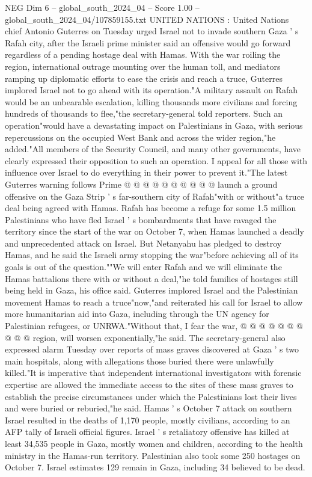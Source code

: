 \begin{textsample}{NEG Dim 6 – global\_south\_2024\_04 – Score 1.00 – global\_south\_2024\_04/107859155.txt}  \label{ex:f6_neg_362}
UNITED NATIONS : United Nations chief Antonio Guterres on Tuesday urged Israel not to invade southern Gaza ' s Rafah city, after the Israeli prime minister said an offensive would go forward regardless of a pending hostage deal with Hamas.
With the war roiling the region, international outrage mounting over the human toll, and mediators ramping up diplomatic efforts to ease the crisis and reach a truce, Guterres implored Israel not to go ahead with its operation."A military assault on Rafah would be an unbearable escalation, killing thousands more civilians and forcing hundreds of thousands to flee,"the secretary-general told reporters.
Such an operation"would have a devastating impact on Palestinians in Gaza, with serious repercussions on the occupied West Bank and across the wider region,"he added."All members of the Security Council, and many other governments, have clearly expressed their opposition to such an operation.
I appeal for all those with influence over Israel to do everything in their power to prevent it."The latest Guterres warning follows Prime @ @ @ @ @ @ @ @ @ @ launch a ground offensive on the Gaza Strip ' s far-southern city of Rafah"with or without"a truce deal being agreed with Hamas.
Rafah has become a refuge for some 1.5 million Palestinians who have fled Israel ' s bombardments that have ravaged the territory since the start of the war on October 7, when Hamas launched a deadly and unprecedented attack on Israel.
But Netanyahu has pledged to destroy Hamas, and he said the Israeli army stopping the war"before achieving all of its goals is out of the question.""We will enter Rafah and we will eliminate the Hamas battalions there with or without a deal,"he told families of hostages still being held in Gaza, his office said.
Guterres implored Israel and the Palestinian movement Hamas to reach a truce"now,"and reiterated his call for Israel to allow more humanitarian aid into Gaza, including through the UN agency for Palestinian refugees, or UNRWA."Without that, I fear the war, @ @ @ @ @ @ @ @ @ @ region, will worsen exponentially,"he said.
The secretary-general also expressed alarm Tuesday over reports of mass graves discovered at Gaza ' s two main hospitals, along with allegations those buried there were unlawfully killed."It is imperative that independent international investigators with forensic expertise are allowed the immediate access to the sites of these mass graves to establish the precise circumstances under which the Palestinians lost their lives and were buried or reburied,"he said.
Hamas ' s October 7 attack on southern Israel resulted in the deaths of 1,170 people, mostly civilians, according to an AFP tally of Israeli official figures.
Israel ' s retaliatory offensive has killed at least 34,535 people in Gaza, mostly women and children, according to the health ministry in the Hamas-run territory.
Palestinian also took some 250 hostages on October 7.
Israel estimates 129 remain in Gaza, including 34 believed to be dead.

\end{textsample}
